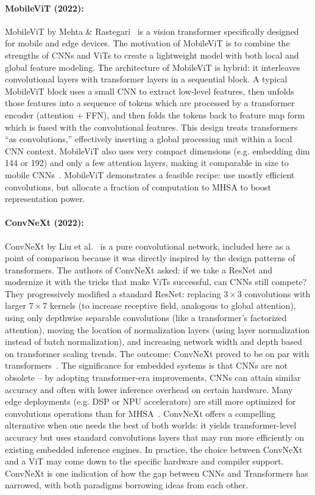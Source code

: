 \documentclass[runningheads,a4paper]{llncs}
\begin{document}
\paragraph{MobileViT (2022):} MobileViT by Mehta \& Rastegari~\cite{mehta2022mobilevit} is a vision transformer specifically designed for mobile and edge devices. The motivation of MobileViT is to combine the strengths of CNNs and ViTs to create a lightweight model with both local and global feature modeling. The architecture of MobileViT is hybrid: it interleaves convolutional layers with transformer layers in a sequential block. A typical MobileViT block uses a small CNN to extract low-level features, then unfolds those features into a sequence of tokens which are processed by a transformer encoder (attention + FFN), and then folds the tokens back to feature map form which is fused with the convolutional features. This design treats transformers “as convolutions,” effectively inserting a global processing unit within a local CNN context. MobileViT also uses very compact dimensions (e.g. embedding dim 144 or 192) and only a few attention layers, making it comparable in size to mobile CNNs~\cite{mehta2022mobilevit}. MobileViT demonstrates a feasible recipe: use mostly efficient convolutions, but allocate a fraction of computation to MHSA to boost representation power.

\paragraph{ConvNeXt (2022):} ConvNeXt by Liu et al.~\cite{liu2022convnext} is a pure convolutional network, included here as a point of comparison because it was directly inspired by the design patterns of transformers. The authors of ConvNeXt asked: if we take a ResNet and modernize it with the tricks that make ViTs successful, can CNNs still compete? They progressively modified a standard ResNet: replacing $3\times3$ convolutions with larger $7\times7$ kernels (to increase receptive field, analogous to global attention), using only depthwise separable convolutions (like a transformer’s factorized attention), moving the location of normalization layers (using layer normalization instead of batch normalization), and increasing network width and depth based on transformer scaling trends. The outcome: ConvNeXt proved to be on par with transformers~\cite{liu2022convnext}. The significance for embedded systems is that CNNs are not obsolete – by adopting transformer-era improvements, CNNs can attain similar accuracy and often with lower inference overhead on certain hardware. Many edge deployments (e.g. DSP or NPU accelerators) are still more optimized for convolutions operations than for MHSA~\cite{Zhao2025H4HNAS,LiPaolieriGolubchik2025,Quadric2023ViT}. ConvNeXt offers a compelling alternative when one needs the best of both worlds: it yields transformer-level accuracy but uses standard convolutions layers that may run more efficiently on existing embedded inference engines. In practice, the choice between ConvNeXt and a ViT may come down to the specific hardware and compiler support. ConvNeXt is one indication of how the gap between CNNs and Transformers has narrowed, with both paradigms borrowing ideas from each other.
\end{document}
